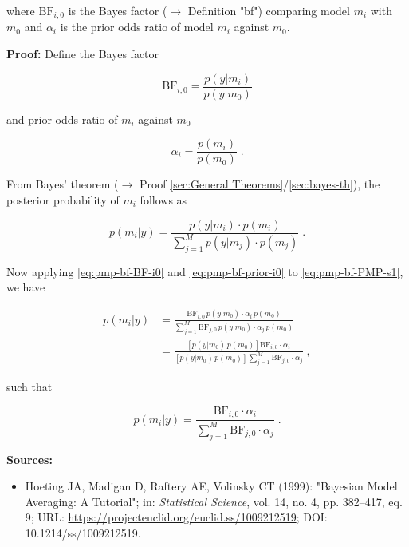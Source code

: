 \documentclass[a4paper,12pt]{book}
\begin{document}
where $\mathrm{BF}_{i,0}$ is the Bayes factor ($\rightarrow$ Definition "bf") comparing model $m_i$ with $m_0$ and $\alpha_i$ is the prior odds ratio of model $m_i$ against $m_0$.


\vspace{1em}
\textbf{Proof:} Define the Bayes factor

\begin{equation} \label{eq:pmp-bf-BF-i0}
\mathrm{BF}_{i,0} = \frac{p(y|m_i)}{p(y|m_0)}
\end{equation}

and prior odds ratio of $m_i$ against $m_0$

\begin{equation} \label{eq:pmp-bf-prior-i0}
\alpha_i = \frac{p(m_i)}{p(m_0)} \; .
\end{equation}

From Bayes' theorem ($\rightarrow$ Proof \ref{sec:General Theorems}/\ref{sec:bayes-th}), the posterior probability of $m_i$ follows as

\begin{equation} \label{eq:pmp-bf-PMP-s1}
p(m_i|y) = \frac{p(y|m_i) \cdot p(m_i)}{\sum_{j=1}^{M} p(y|m_j) \cdot p(m_j)} \; .
\end{equation}

Now applying \eqref{eq:pmp-bf-BF-i0} and \eqref{eq:pmp-bf-prior-i0} to \eqref{eq:pmp-bf-PMP-s1}, we have

\begin{equation} \label{eq:pmp-bf-PMP-s2}
\begin{split}
p(m_i|y) &= \frac{ \mathrm{BF}_{i,0} \, p(y|m_0) \cdot \alpha_i \, p(m_0)}{\sum_{j=1}^{M} \mathrm{BF}_{j,0} \, p(y|m_0) \cdot \alpha_j \, p(m_0)} \\
&= \frac{\left[ p(y|m_0) \, p(m_0) \right] \mathrm{BF}_{i,0} \cdot \alpha_i}{\left[ p(y|m_0) \, p(m_0) \right] \sum_{j=1}^{M} \mathrm{BF}_{j,0} \cdot \alpha_j} \; ,
\end{split}
\end{equation}

such that

\begin{equation} \label{eq:pmp-bf-PMP-BF-qed}
p(m_i|y)= \frac{\mathrm{BF}_{i,0} \cdot \alpha_i}{\sum_{j=1}^{M} \mathrm{BF}_{j,0} \cdot \alpha_j} \; .
\end{equation}

\vspace{1em}
\textbf{Sources:}
\begin{itemize}
\item Hoeting JA, Madigan D, Raftery AE, Volinsky CT (1999): "Bayesian Model Averaging: A Tutorial"; in: \textit{Statistical Science}, vol. 14, no. 4, pp. 382–417, eq. 9; URL: \url{https://projecteuclid.org/euclid.ss/1009212519}; DOI: 10.1214/ss/1009212519.
\end{itemize}
\end{document}
